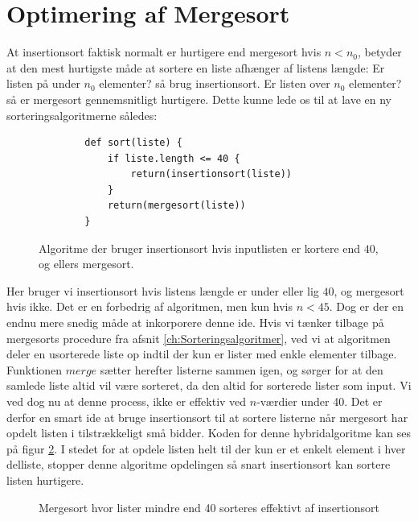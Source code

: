 \section{Optimering af Mergesort}%
\label{sub:Optimering af Mergesort}

At insertionsort faktisk normalt er hurtigere end mergesort hvis $n < n_0$, betyder at den mest hurtigste måde at sortere en liste afhænger af listens længde: Er listen på under $n_0$ elementer? så brug insertionsort. Er listen over $n_0$ elementer? så er mergesort gennemsnitligt hurtigere. Dette kunne lede os til at lave en ny sorteringsalgoritmerne således:

\begin{figure}[h]
	\begin{center}
		\begin{lstlisting}
		def sort(liste) {
			if liste.length <= 40 {
				return(insertionsort(liste))
			}
			return(mergesort(liste))
		}
		\end{lstlisting}
	\end{center}
	\vspace{-6mm}
	\caption{Algoritme der bruger insertionsort hvis inputlisten er kortere end $40$, og ellers mergesort.}
	\label{fig:hybridalgoritme1}
\end{figure}


Her bruger vi insertionsort hvis listens længde er under eller lig $40$, og mergesort hvis ikke. Det er en forbedrig af algoritmen, men kun hvis $n < 45$. Dog er der en endnu mere snedig måde at inkorporere denne ide. Hvis vi tænker tilbage på mergesorts procedure fra afsnit \ref{ch:Sorteringsalgoritmer}, ved vi at algoritmen deler en usorterede liste op indtil der kun er lister med enkle elementer tilbage. Funktionen $merge$ sætter herefter listerne sammen igen, og sørger for at den samlede liste altid vil være sorteret, da den altid for sorterede lister som input. Vi ved dog nu at denne process, ikke er effektiv ved $n$-værdier under 40. Det er derfor en smart ide at bruge insertionsort til at sortere listerne når mergesort har opdelt listen i tilstrækkeligt små bidder. Koden for denne hybridalgoritme kan ses på figur \ref{fig:hybridalgoritme i Python}. I stedet for at opdele listen helt til der kun er et enkelt element i hver delliste, stopper denne algoritme opdelingen så snart insertionsort kan sortere listen hurtigere.


\begin{figure}
	\begin{center}
		
	\end{center}
	\caption{Mergesort hvor lister mindre end 40 sorteres effektivt af insertionsort}
	\label{fig:hybridalgoritme i Python}
\end{figure}







